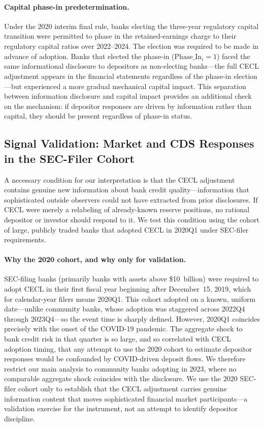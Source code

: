 \paragraph{Capital phase-in predetermination.}
Under the 2020 interim final rule, banks electing the three-year regulatory
capital transition were permitted to phase in the retained-earnings charge to
their regulatory capital ratios over 2022--2024. The election was required to be
made in advance of adoption. Banks that elected the phase-in
($\text{Phase\_In}_i = 1$) faced the same informational disclosure to depositors
as non-electing banks---the full CECL adjustment appears in the financial
statements regardless of the phase-in election---but experienced a more gradual
mechanical capital impact. This separation between information disclosure and
capital impact provides an additional check on the mechanism: if depositor
responses are driven by information rather than capital, they should be present
regardless of phase-in status.

\subsection{Signal Validation: Market and CDS Responses in the SEC-Filer Cohort}
\label{sec:identification:signal}

A necessary condition for our interpretation is that the CECL adjustment
contains genuine new information about bank credit quality---information that
sophisticated outside observers could not have extracted from prior
disclosures. If CECL were merely a relabeling of already-known reserve
positions, no rational depositor or investor should respond to it. We test this
condition using the cohort of large, publicly traded banks that adopted CECL in
2020Q1 under SEC-filer requirements.

\paragraph{Why the 2020 cohort, and why only for validation.}
SEC-filing banks (primarily banks with assets above \$10~billion) were required
to adopt CECL in their first fiscal year beginning after December~15, 2019, which
for calendar-year filers means 2020Q1. This cohort adopted on a known, uniform
date---unlike community banks, whose adoption was staggered across 2022Q4 through
2023Q4---so the event time is sharply defined. However, 2020Q1 coincides
precisely with the onset of the COVID-19 pandemic. The aggregate shock to bank
credit risk in that quarter is so large, and so correlated with CECL adoption
timing, that any attempt to use the 2020 cohort to estimate depositor responses
would be confounded by COVID-driven deposit flows. We therefore restrict our
main analysis to community banks adopting in 2023, where no comparable aggregate
shock coincides with the disclosure. We use the 2020 SEC-filer cohort only to
establish that the CECL adjustment carries genuine information content that moves
sophisticated financial market participants---a validation exercise for the
instrument, not an attempt to identify depositor discipline.

